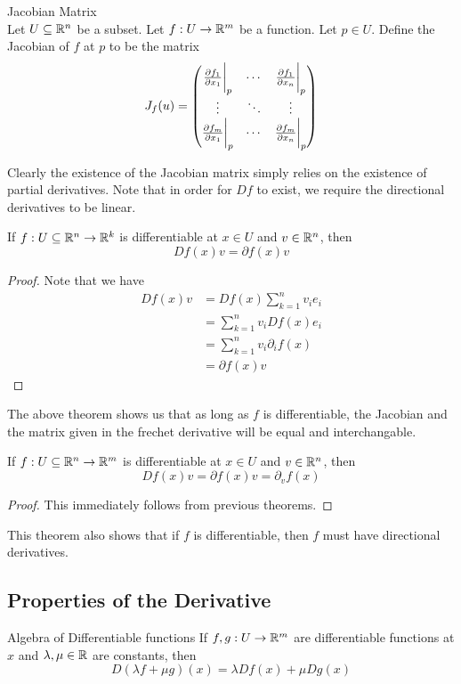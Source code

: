 \documentclass[a4paper]{article}
\begin{document}
\begin{defn}{Jacobian Matrix}{}\\
Let $U\subseteq\mathbb{R}^n$ be a subset. Let $f:U\to\mathbb{R}^m$ be a function. Let $p\in U$. Define the Jacobian of $f$ at $p$ to be the matrix $$J_f(u)=\begin{pmatrix}
\frac{\partial f_1}{\partial x_1}\bigg{|}_p & \cdots & \frac{\partial f_1}{\partial x_n}\bigg{|}_p\\
\vdots & \ddots & \vdots\\
\frac{\partial f_m}{\partial x_1}\bigg{|}_p & \cdots & \frac{\partial f_m}{\partial x_n}\bigg{|}_p
\end{pmatrix}$$
\end{defn}

Clearly the existence of the Jacobian matrix simply relies on the existence of partial derivatives. Note that in order for $Df$ to exist, we require the directional derivatives to be linear. 

\begin{thm}{}{} If $f:U\subseteq\mathbb{R}^n\to\mathbb{R}^k$ is differentiable at $x\in U$ and $v\in\mathbb{R}^n$, then $$Df(x)v=\partial f(x)v$$ 
\begin{proof}
Note that we have
\begin{align*}
Df(x)v&=Df(x)\sum_{k=1}^nv_ie_i\\
&=\sum_{k=1}^nv_iDf(x)e_i\\
&=\sum_{k=1}^nv_i\partial_if(x)\\
&=\partial f(x)v
\end{align*}
\end{proof}
\end{thm}

The above theorem shows us that as long as $f$ is differentiable, the Jacobian and the matrix given in the frechet derivative will be equal and interchangable. 

\begin{lmm}{}{} If $f:U\subseteq\mathbb{R}^n\to\mathbb{R}^m$ is differentiable at $x\in U$ and $v\in\mathbb{R}^n$, then $$Df(x)v=\partial f(x)v=\partial_vf(x)$$ 
\begin{proof}
This immediately follows from previous theorems. 
\end{proof}
\end{lmm}

This theorem also shows that if $f$ is differentiable, then $f$ must have directional derivatives. 

\subsection{Properties of the Derivative}
\begin{thm}{Algebra of Differentiable functions}{} If $f,g:U\to\mathbb{R}^m$ are differentiable functions at $x $ and $\lambda,\mu\in\mathbb{R}$ are constants, then $$D(\lambda f+\mu g)(x )=\lambda Df(x )+\mu Dg(x )$$
\end{thm}
\end{document}
